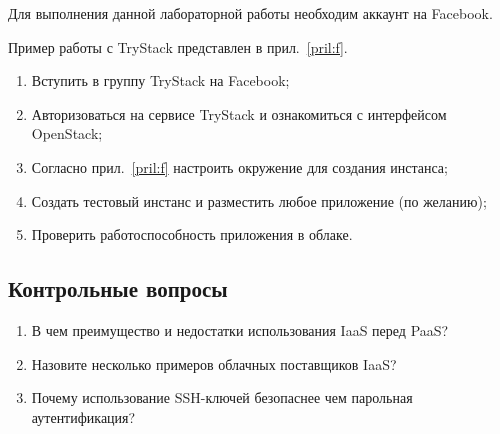 Для выполнения данной лабораторной работы необходим аккаунт на Facebook.

Пример работы с TryStack представлен в прил.~\ref{pril:f}.

\begin{enumerate}
    \item Вступить в группу TryStack на Facebook;
    \item Авторизоваться на сервисе TryStack и ознакомиться с интерфейсом OpenStack;
    \item Согласно прил.~\ref{pril:f} настроить окружение для создания инстанса;
    \item Создать тестовый инстанс и разместить любое приложение (по желанию);
    \item Проверить работоспособность приложения в облаке.
\end{enumerate}

\subsection{Контрольные вопросы}
\begin{enumerate}
    \item В чем преимущество и недостатки использования IaaS перед PaaS?
    \item Назовите несколько примеров облачных поставщиков IaaS?
    \item Почему использование SSH-ключей безопаснее чем парольная аутентификация?
\end{enumerate}

\clearpage
